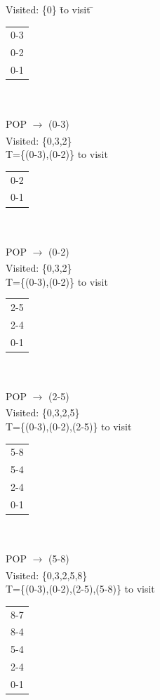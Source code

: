 \documentclass[12pt]{book}
\begin{document}
\begin{enumerate}
\begin{tabbing}
    Visited: \{0\} \hspace{10em} \= to visit \hspace{1em} \= 
        \begin{tabular}{ |c| }
        0-3 \\ 
        0-2 \\  
        0-1 \\
        \hline
        \end{tabular}
    \\\\
    
    POP $\xrightarrow[]{}$ (0-3)\\Visited: \{0,3,2\}\\T=\{(0-3),(0-2)\} \> to visit \>  
        \begin{tabular}{ |c| } 
        0-2 \\  
        0-1 \\
        \hline
        \end{tabular}
    \\\\
    
    POP $\xrightarrow[]{}$ (0-2)\\Visited: \{0,3,2\}\\T=\{(0-3),(0-2)\} \> to visit \>  
        \begin{tabular}{ |c| } 
        2-5\\
        2-4 \\
        0-1 \\
        \hline
        \end{tabular}
    \\\\
    
    POP $\xrightarrow[]{}$ (2-5)\\Visited: \{0,3,2,5\}\\T=\{(0-3),(0-2),(2-5)\} \> to visit \>  
        \begin{tabular}{ |c| } 
        5-8 \\
        5-4 \\
        2-4 \\
        0-1 \\
        \hline
        \end{tabular}
    \\\\
    
    POP $\xrightarrow[]{}$ (5-8)\\Visited: \{0,3,2,5,8\}\\T=\{(0-3),(0-2),(2-5),(5-8)\} \> to visit \>  
        \begin{tabular}{ |c| }
        8-7\\
        8-4\\
        5-4 \\
        2-4 \\
        0-1 \\
        \hline
        \end{tabular}
    \\\\
    

\end{tabbing}
\end{enumerate}
\end{document}
